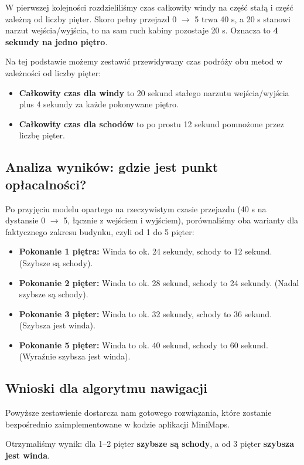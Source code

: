 \documentclass[14pt,a4paper]{extarticle}
\begin{document}
W pierwszej kolejności rozdzieliliśmy czas całkowity windy na część stałą i część zależną od liczby pięter. Skoro pełny przejazd 0 $\rightarrow$ 5 trwa 40 s, a 20 s stanowi narzut wejścia/wyjścia, to na sam ruch kabiny pozostaje 20 s. Oznacza to \textbf{4 sekundy na jedno piętro}.

Na tej podstawie możemy zestawić przewidywany czas podróży obu metod w zależności od liczby pięter:
\begin{itemize}
    \item \textbf{Całkowity czas dla windy} to 20 sekund stałego narzutu wejścia/wyjścia plus 4 sekundy za każde pokonywane piętro.
    \item \textbf{Całkowity czas dla schodów} to po prostu 12 sekund pomnożone przez liczbę pięter.
\end{itemize}

\subsection{Analiza wyników: gdzie jest punkt opłacalności?}
Po przyjęciu modelu opartego na rzeczywistym czasie przejazdu (40 s na dystansie 0 $\rightarrow$ 5, łącznie z wejściem i wyjściem), porównaliśmy oba warianty dla faktycznego zakresu budynku, czyli od 1 do 5 pięter:

\begin{itemize}
    \item \textbf{Pokonanie 1 piętra:} Winda to ok. 24 sekundy, schody to 12 sekund. (Szybsze są schody).
    \item \textbf{Pokonanie 2 pięter:} Winda to ok. 28 sekund, schody to 24 sekundy. (Nadal szybsze są schody).
    \item \textbf{Pokonanie 3 pięter:} Winda to ok. 32 sekundy, schody to 36 sekund. (Szybsza jest winda).
    \item \textbf{Pokonanie 5 pięter:} Winda to ok. 40 sekund, schody to 60 sekund. (Wyraźnie szybsza jest winda).
\end{itemize}

\subsection{Wnioski dla algorytmu nawigacji}
Powyższe zestawienie dostarcza nam gotowego rozwiązania, które zostanie bezpośrednio zaimplementowane w kodzie aplikacji MiniMaps.

Otrzymaliśmy wynik: dla 1--2 pięter \textbf{szybsze są schody}, a od 3 pięter \textbf{szybsza jest winda}.
\end{document}
